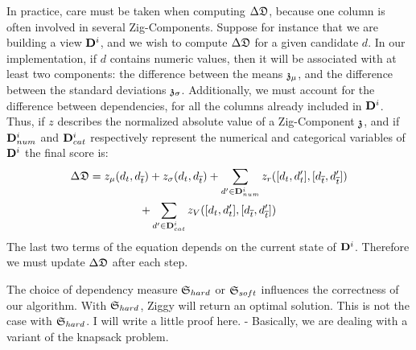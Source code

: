 In practice, care must be taken when computing $\Delta\mathfrak{D}$, because one
column is often involved in several Zig-Components. Suppose for instance that we
are building a view $\mathbf{D}^{i}$, and we wish to compute $\Delta\mathfrak{D}$ for
a given candidate $d$.  In our
implementation, if $d$ contains numeric values, then it will be associated with
at least two components: the difference between the means $\mathfrak{z}_\mu$, and the
difference between the standard deviations $\mathfrak{z}_\sigma$.  Additionally, we must
account for the difference between dependencies, for all the columns
already included in $\mathbf{D}^{i}$. Thus, if $z$ describes the normalized absolute
value of a Zig-Component $\mathfrak{z}$, and if $\mathbf{D}^{i}_{num}$ and
$\mathbf{D}^{i}_{cat}$ respectively represent the numerical and categorical
variables of $\mathbf{D}^{i}$ the final score is:
    \begin{multline}
\Delta\mathfrak{D} = 
z_\mu(d_t, d_{\overline{t}}) +
z_\sigma(d_t, d_{\overline{t}}) +
\sum_{d' \in \mathbf{D}^i_{num}} z_r([d_t, d_t'], [d_{\overline{t}}, d_{\overline{t}}']) \\
+ \sum_{d' \in \mathbf{D}^i_{cat}} z_V([d_t, d_t'], [d_{\overline{t}}, d_{\overline{t}}'])
\end{multline}
The last two terms of the equation depends on the current state of $ \mathbf{D}^i$.
Therefore we must update $\Delta\mathfrak{D}$ after each step.


The choice of dependency measure $\mathfrak{S}_{hard}$ or  $\mathfrak{S}_{soft}$ influences
the correctness of our algorithm. With $\mathfrak{S}_{hard}$, Ziggy will return an
optimal solution. This is not the case with $\mathfrak{S}_{hard}$.  {\color{red} I
    will write a little proof here. - Basically, we are dealing with a variant
of the knapsack problem.}


